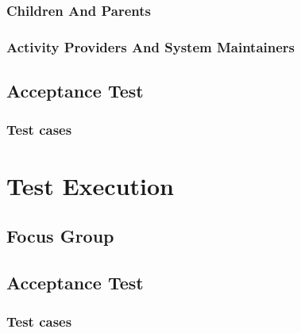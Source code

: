\subsubsection{Children And Parents}

\subsubsection{Activity Providers And System Maintainers}


\subsection{Acceptance Test}
\subsubsection{Test cases}
\label{Test cases}


\section{Test Execution}
\subsection{Focus Group}

\subsection{Acceptance Test}
\subsubsection{Test cases}


\cleardoublepage